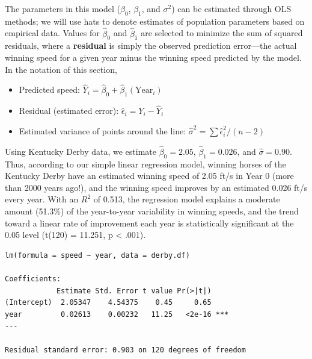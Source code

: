 \documentclass[
]{krantz}
\providecommand{\tightlist}{%
  \setlength{\itemsep}{0pt}\setlength{\parskip}{0pt}}
\begin{document}
The parameters in this model (\(\beta_{0}\), \(\beta_{1}\), and \(\sigma^2\)) can be estimated through OLS methods; we will use hats to denote estimates of population parameters based on empirical data. Values for \(\hat{\beta}_{0}\) and \(\hat{\beta}_{1}\) are selected to minimize the sum of squared residuals, where a \textbf{residual} is simply the observed prediction error---the actual winning speed for a given year minus the winning speed predicted by the model. In the notation of this section,

\begin{itemize}
\tightlist
\item
  Predicted speed: \(\hat{Y}_{i}=\hat{\beta}_{0}+\hat{\beta}_{1}(\textrm{Year}_{i})\)
\item
  Residual (estimated error): \(\hat{\epsilon}_{i}=Y_{i} - \hat{Y}_{i}\)
\item
  Estimated variance of points around the line: \(\hat{\sigma}^2 = \sum \hat{\epsilon}^2_{i} / (n-2)\)
\end{itemize}

Using Kentucky Derby data, we estimate \(\hat{\beta}_{0}=2.05\), \(\hat{\beta}_{1}=0.026\), and \(\hat{\sigma}=0.90\). Thus, according to our simple linear regression model, winning horses of the Kentucky Derby have an estimated winning speed of 2.05 ft/s in Year 0 (more than 2000 years ago!), and the winning speed improves by an estimated 0.026 ft/s every year. With an \(R^2\) of 0.513, the regression model explains a moderate amount (51.3\%) of the year-to-year variability in winning speeds, and the trend toward a linear rate of improvement each year is statistically significant at the 0.05 level (t(120) = 11.251, p \textless{} .001).

\begin{verbatim}
lm(formula = speed ~ year, data = derby.df)

Coefficients:
            Estimate Std. Error t value Pr(>|t|)    
(Intercept)  2.05347    4.54375    0.45     0.65    
year         0.02613    0.00232   11.25   <2e-16 ***
---

Residual standard error: 0.903 on 120 degrees of freedom
\end{verbatim}
\end{document}

